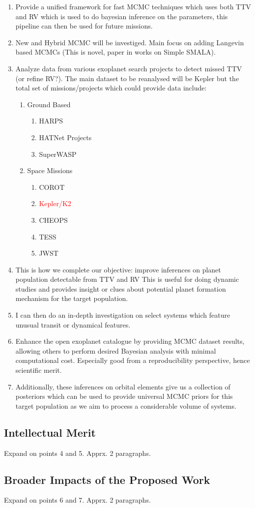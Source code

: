\begin{enumerate}
  \item Provide a unified framework for fast MCMC techniques which uses both TTV and RV which is used to do bayesian inference on the parameters, this pipeline can then be used for future missions.
  \item New and Hybrid MCMC will be investiged. Main focus on adding Langevin based MCMCs (This is novel, paper in works on Simple SMALA).
  \item Analyze data from various exoplanet search projects to detect missed TTV (or refine RV?). The main dataset to be reanalysed will be Kepler but the total set of missions/projects which could provide data include: 
      \begin{enumerate}
      \item Ground Based
      		\begin{enumerate}
      		\item HARPS
      		\item HATNet Projects
      		\item SuperWASP
      		\end{enumerate}
      \item Space Missions
      		\begin{enumerate}
            \item COROT
      		\item \textcolor{red}{Kepler/K2}
           	\item CHEOPS
      		\item TESS
            \item JWST
      		\end{enumerate}
      \end{enumerate}
  \item This is how we complete our objective: improve inferences on planet population detectable from TTV and RV This is useful for doing dynamic studies and provides insight or clues about potential planet formation mechanism for the target population.
  \item I can then do an in-depth investigation on select systems which feature unusual transit or dynamical features.
  \item Enhance the open exoplanet catalogue by providing MCMC dataset results, allowing others to perform desired Bayesian analysis with minimal computational cost. Especially good from a reproducibility perspective, hence scientific merit.
  \item Additionally, these inferences on orbital elements give us a collection of posteriors which can be used to provide universal MCMC priors for this target population as we aim to process a considerable volume of systems.
\end{enumerate}


\subsection{Intellectual Merit} 
Expand on points 4 and 5. Apprx. 2 paragraphs.
\subsection{Broader Impacts of the Proposed Work} 
Expand on points 6 and 7. Apprx. 2 paragraphs.
